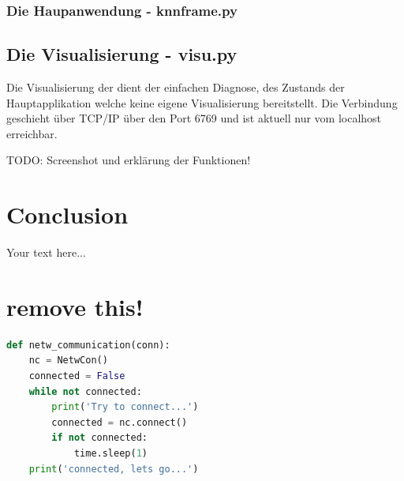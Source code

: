 \documentclass[12pt,twoside]{article}
\theoremstyle{plain}
\theoremstyle{definition}
\theoremstyle{remark}
\begin{document}
\subsubsection{Die Haupanwendung - knnframe.py}
\label{knnframe.py}


\subsection{Die Visualisierung - visu.py}
\label{visu.py}

Die Visualisierung der dient der einfachen Diagnose, des Zustands der Hauptapplikation welche keine eigene Visualisierung bereitstellt. Die Verbindung geschieht über TCP/IP über den Port 6769 und ist aktuell nur vom localhost erreichbar.

TODO: Screenshot und erklärung der Funktionen! 




\section{Conclusion}


Your text here...





\section{remove this!}
\label{sec:concl}

\begin{lstlisting}[frame=single,language=Python]  % Start your code-block
def netw_communication(conn):
    nc = NetwCon()
    connected = False
    while not connected:
        print('Try to connect...')
        connected = nc.connect()
        if not connected:
            time.sleep(1)
    print('connected, lets go...')
\end{lstlisting}
\end{document}
